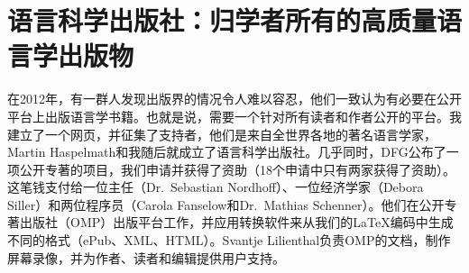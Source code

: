 \section*{语言科学出版社：归学者所有的高质量语言学出版物}

在2012年，有一群人发现出版界的情况令人难以容忍，他们一致认为有必要在公开平台上出版语言学书籍。也就是说，需要一个针对所有读者和作者公开的平台。我建立了一个网页，并征集了支持者，他们是来自全世界各地的著名语言学家，Martin Haspelmath和我随后就成立了语言科学出版社。几乎同时，DFG公布了一项公开专著的项目，我们申请\citep{MH2013a}并获得了资助（18个申请中只有两家获得了资助）。这笔钱支付给一位主任（Dr.\ Sebastian Nordhoff）、一位经济学家（Debora Siller）和两位程序员（Carola Fanselow和Dr.\ Mathias Schenner）。他们在公开专著出版社（OMP）出版平台工作，并应用转换软件来从我们的\LaTeX{}编码中生成不同的格式（ePub、XML、HTML）。Svantje Lilienthal负责OMP的文档，制作屏幕录像，并为作者、读者和编辑提供用户支持。

